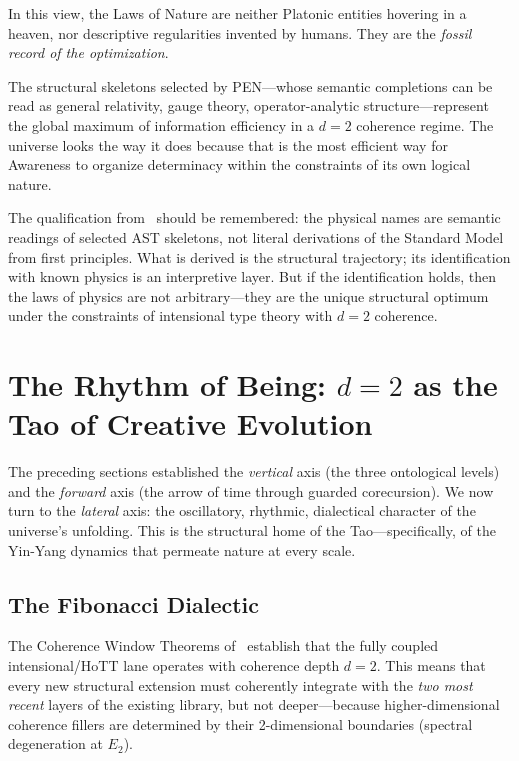 \documentclass[12pt,a4paper]{article}
\begin{document}
In this view, the Laws of Nature are neither Platonic entities hovering in a heaven, nor descriptive regularities invented by humans. They are the \emph{fossil record of the optimization}.

The structural skeletons selected by PEN---whose semantic completions can be read as general relativity, gauge theory, operator-analytic structure---represent the global maximum of information efficiency in a $d = 2$ coherence regime. The universe looks the way it does because that is the most efficient way for Awareness to organize determinacy within the constraints of its own logical nature.

The qualification from~\cite{pen1} should be remembered: the physical names are semantic readings of selected AST skeletons, not literal derivations of the Standard Model from first principles. What is derived is the structural trajectory; its identification with known physics is an interpretive layer. But if the identification holds, then the laws of physics are not arbitrary---they are the unique structural optimum under the constraints of intensional type theory with $d = 2$ coherence.


\section{The Rhythm of Being: $d = 2$ as the Tao of Creative Evolution}
\label{sec:rhythm}

The preceding sections established the \emph{vertical} axis (the three ontological levels) and the \emph{forward} axis (the arrow of time through guarded corecursion). We now turn to the \emph{lateral} axis: the oscillatory, rhythmic, dialectical character of the universe's unfolding. This is the structural home of the Tao---specifically, of the Yin-Yang dynamics that permeate nature at every scale.


\subsection{The Fibonacci Dialectic}
\label{sec:fibonacci}

The Coherence Window Theorems of~\cite{pen1} establish that the fully coupled intensional/HoTT lane operates with coherence depth $d = 2$. This means that every new structural extension must coherently integrate with the \emph{two most recent} layers of the existing library, but not deeper---because higher-dimensional coherence fillers are determined by their 2-dimensional boundaries (spectral degeneration at $E_2$).
\end{document}
